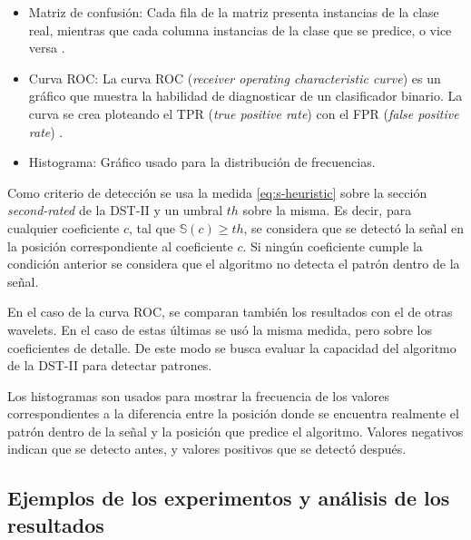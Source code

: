 \begin{itemize}
	\item Matriz de confusión: Cada fila de la matriz presenta instancias de la clase real, mientras que cada columna instancias
		de la clase que se predice, o vice versa \cite{wikipedia_2022_confusion_matrix}.
	\item Curva ROC: La curva ROC (\textit{receiver operating characteristic curve}) es un gráfico que muestra la habilidad de diagnosticar
		de un clasificador binario. La curva se crea ploteando el TPR (\textit{true positive rate}) con el FPR (\textit{false positive rate})
		\cite{wikipedia_2022_roc}.
	\item Histograma: Gráfico usado para la distribución de frecuencias. 
\end{itemize}

Como criterio de detección se usa la medida \ref{eq:s-heuristic} sobre la sección \textit{second-rated} de la
DST-II y un umbral $th$ sobre la misma. Es decir, para cualquier coeficiente $c$, tal que $\mathbb{S}(c)\geq th$, se considera
que se detectó la señal en la posición correspondiente al coeficiente $c$. Si ningún coeficiente cumple la condición
anterior se considera que el algoritmo no detecta el patrón dentro de la señal. 

En el caso de la curva ROC, se comparan también los resultados con el de otras wavelets. En el caso de estas
últimas se usó la misma medida, pero sobre los coeficientes de detalle. De este modo se busca evaluar 
la capacidad del algoritmo de la DST-II para detectar patrones.

Los histogramas son usados para mostrar la frecuencia de los valores correspondientes a la diferencia entre
la posición donde se encuentra realmente el patrón dentro de la señal y la posición que predice el algoritmo.
Valores negativos indican que se detecto antes, y valores positivos que se detectó después.

\subsection{Ejemplos de los experimentos y análisis de los resultados}

